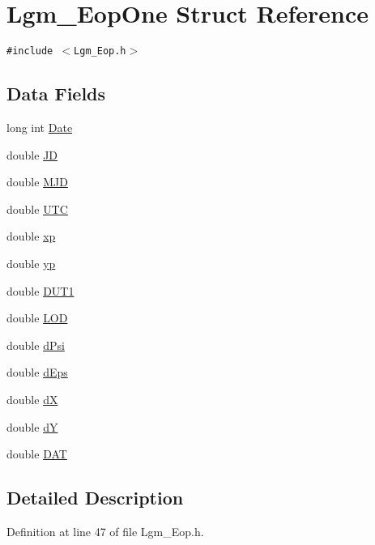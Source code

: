 \hypertarget{struct_lgm___eop_one}{
\section{Lgm\_\-EopOne Struct Reference}
\label{struct_lgm___eop_one}
}
{\tt \#include $<$Lgm\_\-Eop.h$>$}

\subsection*{Data Fields}
\begin{CompactItemize}
\item 
long int \hyperlink{struct_lgm___eop_one_8c1b7b17183e48a6fafaf6302e1b1da9}{Date}
\item 
double \hyperlink{struct_lgm___eop_one_fca64005cd84fa9e811dac5219a618ad}{JD}
\item 
double \hyperlink{struct_lgm___eop_one_38c1b91ef6994f7a99c5b3eccd97d1e8}{MJD}
\item 
double \hyperlink{struct_lgm___eop_one_4eccefabe940625eb9277991aa138a38}{UTC}
\item 
double \hyperlink{struct_lgm___eop_one_f649efec4c4f51f4db0ebb935a83d015}{xp}
\item 
double \hyperlink{struct_lgm___eop_one_7841edcbdbfea2b400dea7753dcfac9e}{yp}
\item 
double \hyperlink{struct_lgm___eop_one_3711c22856595eb27022ddb8680cec06}{DUT1}
\item 
double \hyperlink{struct_lgm___eop_one_190ed8b9906021fb489dc2ee35881d8b}{LOD}
\item 
double \hyperlink{struct_lgm___eop_one_bdbb574b7039f3276386228756be3072}{dPsi}
\item 
double \hyperlink{struct_lgm___eop_one_da0088f7b27e9da12e8e3bf8e9cf61b7}{dEps}
\item 
double \hyperlink{struct_lgm___eop_one_5559d17f092df97e1797a76209e0caa0}{dX}
\item 
double \hyperlink{struct_lgm___eop_one_5b69e4344b7089d8a3c6db32a3c38551}{dY}
\item 
double \hyperlink{struct_lgm___eop_one_e588c8af37ba03583b88718e40df15f2}{DAT}
\end{CompactItemize}


\subsection{Detailed Description}


Definition at line 47 of file Lgm\_\-Eop.h.

